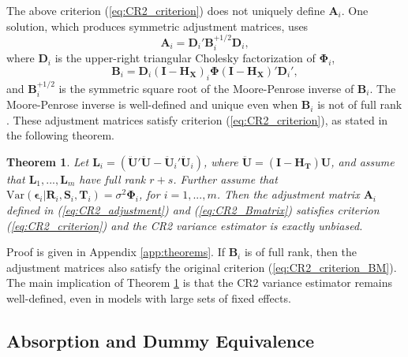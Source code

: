 \documentclass[12pt]{article}\usepackage[]{graphicx}\usepackage[]{color}
\newtheorem{thm}{Theorem}
\newcommand{\Var}{\text{Var}}
\newcommand{\bm}{\mathbf}
\newcommand{\bs}{\boldsymbol}
\begin{document}
The above criterion (\ref{eq:CR2_criterion}) does not uniquely define $\bm{A}_i$. One solution, which produces symmetric adjustment matrices, uses
\begin{equation}
\label{eq:CR2_adjustment}
\bm{A}_i = \bm{D}_i' \bm{B}_i^{+1/2} \bm{D}_i,
\end{equation}
where $\bm{D}_i$ is the upper-right triangular Cholesky factorization of $\bs\Phi_i$, 
\begin{equation}
\label{eq:CR2_Bmatrix}
\bm{B}_i = \bm{D}_i\left(\bm{I} - \bm{H_X}\right)_i \bs\Phi \left(\bm{I} - \bm{H_X}\right)' \bm{D}_i',
\end{equation}
and $\bm{B}_i^{+1/2}$ is the symmetric square root of the Moore-Penrose inverse of $\bm{B}_i $. 
The Moore-Penrose inverse is well-defined and unique even when $\bm{B}_i$ is not of full rank \citep[][Thm. 9.18]{Banerjee2014linear}. These adjustment matrices satisfy criterion (\ref{eq:CR2_criterion}), as stated in the following theorem.

\begin{thm}
\label{thm:BRL_FE}
Let $\bm{L}_i = \left(\bm{\ddot{U}}'\bm{\ddot{U}} - \bm{\ddot{U}}_i'\bm{\ddot{U}}_i\right)$, where $\bm{\ddot{U}} = \left(\bm{I} - \bm{H_T}\right)\bm{U}$, and assume that $\bm{L}_1,...,\bm{L}_m$ have full rank $r + s$. Further assume that $\Var\left(\bs\epsilon_i\left|\bm{R}_i,\bm{S}_i,\bm{T}_i\right.\right) = \sigma^2 \bs\Phi_i$, for $i = 1,...,m$. Then the adjustment matrix $\bm{A}_i$ defined in (\ref{eq:CR2_adjustment}) and (\ref{eq:CR2_Bmatrix}) satisfies criterion (\ref{eq:CR2_criterion}) and the CR2 variance estimator is exactly unbiased.
\end{thm}

Proof is given in Appendix \ref{app:theorems}. If $\bm{B}_i$ is of full rank, then the adjustment matrices also satisfy the original criterion (\ref{eq:CR2_criterion_BM}). The main implication of Theorem \ref{thm:BRL_FE} is that the CR2 variance estimator remains well-defined, even in models with large sets of fixed effects.

\subsection{Absorption and Dummy Equivalence}
\end{document}
